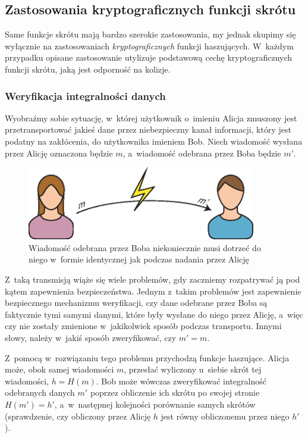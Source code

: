 \pagebreak



\subsection{Zastosowania kryptograficznych funkcji skrótu}
\label{sec:secure_hash_usages}
Same funkcje skrótu mają bardzo szerokie zastosowania, my jednak skupimy się
wyłącznie na zastosowaniach \emph{kryptograficznych} funkcji haszujących.
W~każdym przypadku opisane zastosowanie utylizuje podstawową cechę
kryptograficznych funkcji skrótu, jaką jest odporność na kolizje.



\subsubsection{Weryfikacja integralności danych}
\label{sec:usage_integrity_check}
Wyobraźmy sobie sytuację, w~której użytkownik o~imieniu Alicja zmuszony jest
przetransportować jakieś dane przez niebezpieczny kanał informacji, który jest
podatny na zakłócenia, do użytkownika imieniem Bob. Niech wiadomość wysłana
przez Alicję oznaczona będzie $m$, a~wiadomość odebrana przez Boba będzie $m'$.

\begin{figure}[htb!]
    \includegraphics[width=10cm]{img/usage1.eps}
    \caption{Wiadomość odebrana przez Boba niekoniecznie musi dotrzeć do niego
    w~formie identycznej jak podczas nadania przez Alicję}
    \label{fig:usage_integrity_check_1}
\end{figure}

Z~taką transmisją wiąże się wiele problemów, gdy zaczniemy rozpatrywać ją pod
kątem zapewnienia bezpieczeństwa. Jednym z~takim problemów jest zapewnienie
bezpiecznego mechanizmu weryfikacji, czy dane odebrane przez Boba są faktycznie
tymi samymi danymi, które były wysłane do niego przez Alicję, a~więc czy nie
zostały zmienione w~jakikolwiek sposób podczas transportu. Innymi słowy, należy
w~jakiś sposób zweryfikować, czy $m' = m$.

Z~pomocą w~rozwiązaniu tego problemu przychodzą funkcje haszujące. Alicja może,
obok samej wiadomości $m$, przesłać wyliczony u~siebie skrót tej wiadomości,
$h=H(m)$. Bob może wówczas zweryfikować integralność odebranych danych $m'$
poprzez obliczenie ich skrótu po swojej stronie $H(m')=h'$, a~w~następnej
kolejności porównanie samych skrótów (sprawdzenie, czy obliczony przez Alicję
$h$ jest równy obliczonemu przez niego $h'$).

